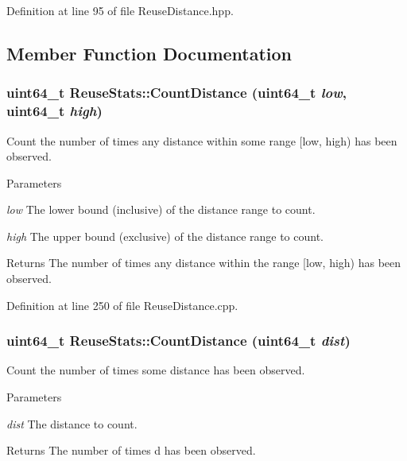 Definition at line 95 of file ReuseDistance.hpp.



\subsection{Member Function Documentation}
\hypertarget{class_reuse_stats_a07265484c0c3b4348ea090d28de37cbe}{
\subsubsection[{CountDistance}]{\setlength{\rightskip}{0pt plus 5cm}uint64\_\-t ReuseStats::CountDistance (uint64\_\-t {\em low}, \/  uint64\_\-t {\em high})}}
\label{class_reuse_stats_a07265484c0c3b4348ea090d28de37cbe}
Count the number of times any distance within some range \mbox{[}low, high) has been observed.


\begin{DoxyParams}{Parameters}
\item[{\em low}]The lower bound (inclusive) of the distance range to count. \item[{\em high}]The upper bound (exclusive) of the distance range to count.\end{DoxyParams}
\begin{DoxyReturn}{Returns}
The number of times any distance within the range \mbox{[}low, high) has been observed. 
\end{DoxyReturn}


Definition at line 250 of file ReuseDistance.cpp.

\hypertarget{class_reuse_stats_abdb92b77ec7191be80e77a34f894e11b}{
\subsubsection[{CountDistance}]{\setlength{\rightskip}{0pt plus 5cm}uint64\_\-t ReuseStats::CountDistance (uint64\_\-t {\em dist})}}
\label{class_reuse_stats_abdb92b77ec7191be80e77a34f894e11b}
Count the number of times some distance has been observed.


\begin{DoxyParams}{Parameters}
\item[{\em dist}]The distance to count.\end{DoxyParams}
\begin{DoxyReturn}{Returns}
The number of times d has been observed. 
\end{DoxyReturn}


